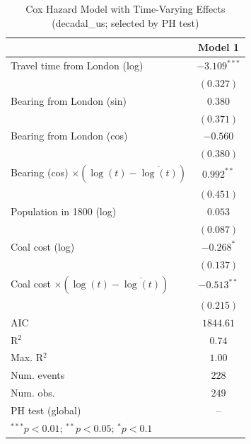 
\begin{table}
\begin{center}
\begin{tabular}{l c}
\hline
 & Model 1 \\
\hline
Travel time from London (log) & $-3.109^{***}$ \\
 & $(0.327)$ \\
Bearing from London (sin) & $0.380$ \\
 & $(0.371)$ \\
Bearing from London (cos) & $-0.560$ \\
 & $(0.380)$ \\
Bearing (cos) $\times (\log(t)-\overline{\log(t)})$ & $0.992^{**}$ \\
 & $(0.451)$ \\
Population in 1800 (log) & $0.053$ \\
 & $(0.087)$ \\
Coal cost (log) & $-0.268^{*}$ \\
 & $(0.137)$ \\
Coal cost $\times (\log(t)-\overline{\log(t)})$ & $-0.513^{**}$ \\
 & $(0.215)$ \\
\hline
AIC              & $1844.61$ \\
R$^2$            & $0.74$ \\
Max. R$^2$       & $1.00$ \\
Num. events      & $228$ \\
Num. obs.        & $249$ \\
PH test (global) & -- \\
\hline
\multicolumn{2}{l}{\scriptsize{$^{***}p<0.01$; $^{**}p<0.05$; $^{*}p<0.1$}}
\end{tabular}
\caption{Cox Hazard Model with Time-Varying Effects (decadal\_us; selected by PH test)}
\label{tab:cox_serious_tv_decadal_us}
\end{center}
\end{table}
